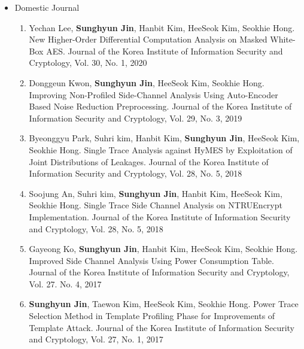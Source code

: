\documentclass[a4paper,20pt]{article}
\begin{document}
\begin{itemize}
\begin{enumerate}
            \vspace{-2pt}
        \end{enumerate}
    \item {Domestic Journal}
        \vspace{-6pt}
        \begin{enumerate}
            \item {Yechan Lee, \textbf{Sunghyun Jin}, Hanbit Kim, HeeSeok Kim, Seokhie Hong. New Higher-Order Differential Computation Analysis on Masked White-Box AES. Journal of the Korea Institute of Information Security and Cryptology, Vol. 30, No. 1, 2020}
            \vspace{-2pt}
            \item {Donggeun Kwon, \textbf{Sunghyun Jin}, HeeSeok Kim, Seokhie Hong. Improving Non-Profiled Side-Channel Analysis Using Auto-Encoder Based Noise Reduction Preprocessing. Journal of the Korea Institute of Information Security and Cryptology, Vol. 29, No. 3, 2019}
            \vspace{-2pt}
            \item {Byeonggyu Park, Suhri kim, Hanbit Kim, \textbf{Sunghyun Jin}, HeeSeok Kim, Seokhie Hong. Single Trace Analysis against HyMES by Exploitation of Joint Distributions of Leakages. Journal of the Korea Institute of Information Security and Cryptology, Vol. 28, No. 5, 2018}
            \vspace{-2pt}
            \item {Soojung An, Suhri kim, \textbf{Sunghyun Jin}, Hanbit Kim, HeeSeok Kim, Seokhie Hong. Single Trace Side Channel Analysis on NTRUEncrypt Implementation. Journal of the Korea Institute of Information Security and Cryptology, Vol. 28, No. 5, 2018}
            \vspace{-2pt}
            \item {Gayeong Ko, \textbf{Sunghyun Jin}, Hanbit Kim, HeeSeok Kim, Seokhie Hong. Improved Side Channel Analysis Using Power Consumption Table. Journal of the Korea Institute of Information Security and Cryptology, Vol. 27. No. 4, 2017}
            \vspace{-2pt}
            \item {\textbf{Sunghyun Jin}, Taewon Kim, HeeSeok Kim, Seokhie Hong. Power Trace Selection Method in Template Profiling Phase for Improvements of Template Attack. Journal of the Korea Institute of Information Security and Cryptology, Vol. 27, No. 1, 2017}
            \vspace{-2pt}
        \end{enumerate}

\end{itemize}
\end{document}
